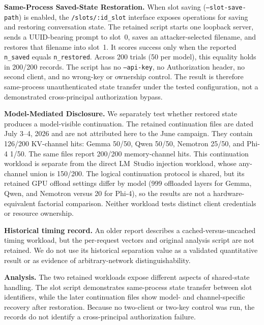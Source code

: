 \documentclass[journal,tifs]{IEEEtran}
\begin{document}

{\bf Same-Process Saved-State Restoration.}
When slot saving (\texttt{--slot-save-path}) is enabled, the
\texttt{/slots/:id\_slot} interface exposes operations for saving and
restoring conversation state. The retained script starts one loopback
server, sends a UUID-bearing prompt to slot~0, saves an attacker-selected
filename, and restores that filename into slot~1. It scores success only
when the reported \texttt{n\_saved} equals \texttt{n\_restored}. Across
200 trials (50 per model), this equality holds in 200/200 records. The
script has no \texttt{--api-key}, no Authorization header, no second client,
and no wrong-key or ownership control. The result is therefore same-process
unauthenticated state transfer under the tested configuration, not a
demonstrated cross-principal authorization bypass.


{\bf Model-Mediated Disclosure.}
We separately test whether restored state produces a model-visible
continuation. The retained continuation files are dated July 3--4, 2026
and are not attributed here to the June campaign. They contain 126/200
KV-channel hits: Gemma 50/50, Qwen 50/50, Nemotron 25/50, and Phi-4 1/50.
The same files report 200/200 memory-channel hits. This continuation
workload is separate from the direct LM~Studio injection workload, whose
any-channel union is 150/200. The logical continuation protocol is shared,
but its retained GPU offload settings differ by model (999 offloaded layers
for Gemma, Qwen, and Nemotron versus 20 for Phi-4), so the results are not a
hardware-equivalent factorial comparison. Neither workload tests distinct
client credentials or resource ownership.


{\bf Historical timing record.}
An older report describes a cached-versus-uncached timing workload, but the
per-request vectors and original analysis script are not retained. We do
not use its historical separation value as a validated quantitative result
or as evidence of arbitrary-network distinguishability.


{\bf Analysis.}
The two retained workloads expose different aspects of shared-state
handling. The slot script demonstrates same-process state transfer between
slot identifiers, while the later continuation files show model- and
channel-specific recovery after restoration. Because no two-client or
two-key control was run, the records do not identify a cross-principal
authorization failure.
\end{document}
